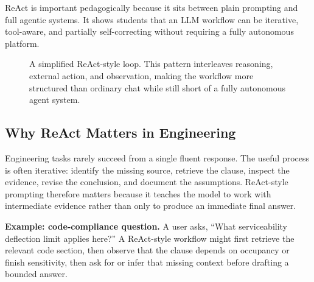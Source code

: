 \documentclass[12pt]{article}
\begin{document}
ReAct is important pedagogically because it sits between plain prompting and full agentic systems. It shows students that an LLM workflow can be iterative, tool-aware, and partially self-correcting without requiring a fully autonomous platform.

\begin{figure}[ht]
    \centering
    \caption{A simplified ReAct-style loop. This pattern interleaves reasoning, external action, and observation, making the workflow more structured than ordinary chat while still short of a fully autonomous agent system.}
    \label{t16fig:react}
\end{figure}

\subsection{Why ReAct Matters in Engineering}

Engineering tasks rarely succeed from a single fluent response. The useful process is often iterative: identify the missing source, retrieve the clause, inspect the evidence, revise the conclusion, and document the assumptions. ReAct-style prompting therefore matters because it teaches the model to work with intermediate evidence rather than only to produce an immediate final answer.

\begin{ex-box}
\textbf{Example: code-compliance question.} A user asks, ``What serviceability deflection limit applies here?'' A ReAct-style workflow might first retrieve the relevant code section, then observe that the clause depends on occupancy or finish sensitivity, then ask for or infer that missing context before drafting a bounded answer.
\end{ex-box}
\end{document}
